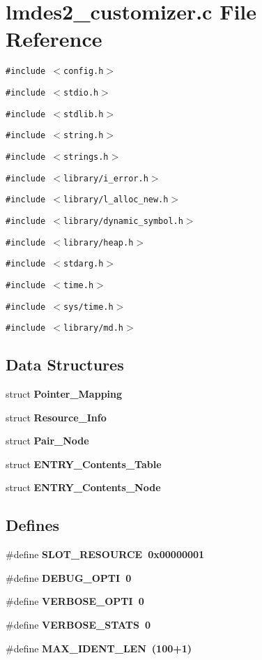 \section{lmdes2\_\-customizer.c File Reference}
\label{lmdes2__customizer_8c}
{\tt \#include $<$config.h$>$}\par
{\tt \#include $<$stdio.h$>$}\par
{\tt \#include $<$stdlib.h$>$}\par
{\tt \#include $<$string.h$>$}\par
{\tt \#include $<$strings.h$>$}\par
{\tt \#include $<$library/i\_\-error.h$>$}\par
{\tt \#include $<$library/l\_\-alloc\_\-new.h$>$}\par
{\tt \#include $<$library/dynamic\_\-symbol.h$>$}\par
{\tt \#include $<$library/heap.h$>$}\par
{\tt \#include $<$stdarg.h$>$}\par
{\tt \#include $<$time.h$>$}\par
{\tt \#include $<$sys/time.h$>$}\par
{\tt \#include $<$library/md.h$>$}\par
\subsection*{Data Structures}
\begin{CompactItemize}
\item 
struct \bf{Pointer\_\-Mapping}
\item 
struct \bf{Resource\_\-Info}
\item 
struct \bf{Pair\_\-Node}
\item 
struct \bf{ENTRY\_\-Contents\_\-Table}
\item 
struct \bf{ENTRY\_\-Contents\_\-Node}
\end{CompactItemize}
\subsection*{Defines}
\begin{CompactItemize}
\item 
\#define \bf{SLOT\_\-RESOURCE}~0x00000001
\item 
\#define \bf{DEBUG\_\-OPTI}~0
\item 
\#define \bf{VERBOSE\_\-OPTI}~0
\item 
\#define \bf{VERBOSE\_\-STATS}~0
\item 
\#define \bf{MAX\_\-IDENT\_\-LEN}~(100+1)
\end{CompactItemize}
